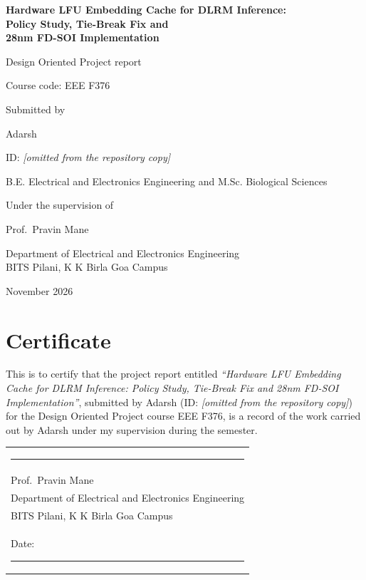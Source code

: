 \documentclass[11pt,a4paper]{report}
\newcommand{\reportdate}{November 2026}
\newcommand{\coursecode}{EEE F376}
\newcommand{\studentid}{\textit{[omitted from the repository copy]}}
\begin{document}

\begin{titlepage}
\centering
\vspace*{1.5cm}
{\LARGE\bfseries Hardware LFU Embedding Cache for DLRM Inference:\\[4pt] Policy Study, Tie-Break Fix and\\[4pt]
28nm FD-SOI Implementation\par}
\vspace{1.5cm}
{\large Design Oriented Project report\par}
\vspace{0.4cm}
{\large Course code: \coursecode\par}
\vspace{1.5cm}
{\large Submitted by\par}
\vspace{0.3cm}
{\Large Adarsh\par}
{\large ID: \studentid\par}
{\large B.E. Electrical and Electronics Engineering and M.Sc. Biological Sciences\par}
\vspace{1.2cm}
{\large Under the supervision of\par}
\vspace{0.3cm}
{\Large Prof.\ Pravin Mane\par}
\vfill
{\large Department of Electrical and Electronics Engineering\\
BITS Pilani, K K Birla Goa Campus\par}
\vspace{0.5cm}
{\large \reportdate\par}
\end{titlepage}

\chapter*{Certificate}
This is to certify that the project report entitled \emph{``Hardware LFU Embedding Cache for DLRM Inference: Policy
Study, Tie-Break Fix and 28nm FD-SOI Implementation''}, submitted by Adarsh (ID: \studentid) for the Design Oriented
Project course \coursecode{}, is a record of the work carried out by Adarsh under my supervision during the semester.

\vspace{3cm}
\noindent
\begin{tabular}{@{}l@{}}
\rule{6cm}{0.4pt}\\
Prof.\ Pravin Mane\\
Department of Electrical and Electronics Engineering\\
BITS Pilani, K K Birla Goa Campus\\[1cm]
Date: \rule{4cm}{0.4pt}
\end{tabular}
\end{document}
